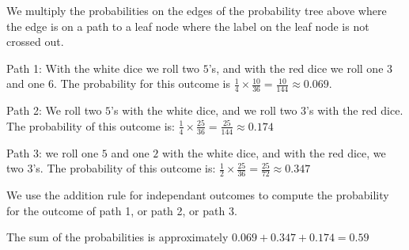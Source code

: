 \documentclass[a4paper,11pt]{article}
\begin{document}
We multiply the probabilities on the edges of the probability tree above
where the edge is on a path to a leaf node where the label on
the leaf node is not crossed out.

Path 1: With the white dice we roll two $5$'s, and with the red dice
we roll one $3$ and one $6$.  The probability for this outcome is
$\frac{1}{4} \times \frac{10}{36} = \frac{10}{144} \approx 0.069$.

Path 2: We roll two $5$'s with the white dice, and we roll two $3$'s
with the red dice.  The probability of this outcome is:
$\frac{1}{4} \times \frac{25}{36} = \frac{25}{144} \approx 0.174$

Path 3: we roll one $5$ and one $2$ with the white dice,
and with the red dice, we two $3$'s.  The probability of this outcome 
is: $\frac{1}{2} \times \frac{25}{36} = \frac{25}{72} \approx 0.347$

We use the addition rule for independant outcomes to compute the
probability for the outcome of path 1, or path 2, or path 3.

The sum of the probabilities is approximately 
$0.069 + 0.347 + 0.174 = 0.59$

\printbibliography
\end{document}
